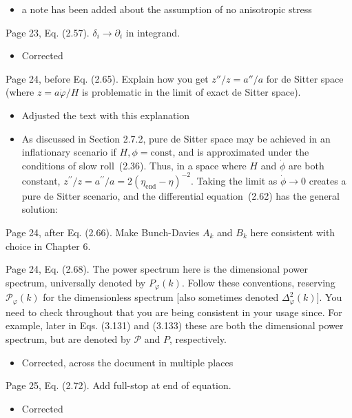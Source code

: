 \documentclass[11pt]{article}
\newcommand{\todo}[1]{{\color{red} #1}}
\begin{document}
\begin{enumerate}
\begin{itemize}
    \item a note has been added about the assumption of no anisotropic stress
  \end{itemize}
\item Page 23, Eq. (2.57). $\delta_i \rightarrow \partial_i$ in
  integrand.
  \begin{itemize}
    \item Corrected
  \end{itemize}
\item Page 24, before Eq. (2.65). Explain how you get $z''/z = a''/a$
  for de Sitter space (where $z = a\dot{\varphi}/H$ is problematic in
  the limit of exact de Sitter space).
  \begin{itemize}
    \item Adjusted the text with this explanation
    \item As discussed in Section 2.7.2, pure de Sitter space may be achieved in an inflationary scenario if \(H,\phi=\mathrm{const}\), and is approximated under the conditions of slow roll~(2.36).  Thus, in a space where \(H\) and \(\dot\phi\) are both constant, \({z^{\prime\prime}/z = a^{\prime\prime}/a = 2{(\eta_\mathrm{end}-\eta)}^{-2}}\). Taking the limit as \(\dot{\phi}\to0\) creates a pure de Sitter scenario, and the differential equation~(2.62) has the general solution:
  \end{itemize}
  \todo{
\item Page 24, after Eq. (2.66). Make Bunch-Davies $A_k$ and $B_k$
  here consistent with choice in Chapter 6.
}
\todo{
\item Page 24, Eq. (2.68). The power spectrum here is the dimensional
  power spectrum, universally denoted by $P_{\varphi}(k)$. Follow
  these conventions, reserving $\mathcal{P}_\varphi(k)$ for the
  dimensionless spectrum [also sometimes denoted
  $\Delta_\varphi^2(k)$]. You need to check throughout that you are
  being consistent in your usage since. For example, later in
  Eqs. (3.131) and (3.133) these are both the dimensional power
  spectrum, but are denoted by $\mathcal{P}$ and $P$, respectively.
}
\begin{itemize}
    \item Corrected, across the document in multiple places
\end{itemize}
\item Page 25, Eq. (2.72). Add full-stop at end of equation.
  \begin{itemize}
    \item Corrected
  \end{itemize}

\end{enumerate}
\end{document}

